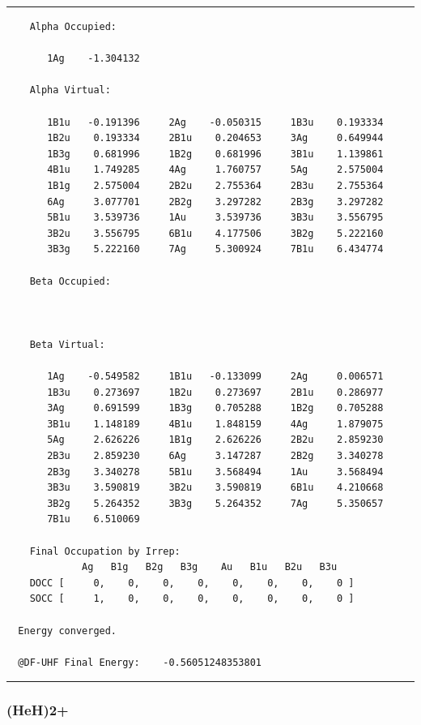\documentclass[portuguese,]{article}
\begin{document}
\begin{center}\rule{0.5\linewidth}{\linethickness}\end{center}

\begin{verbatim}
    Alpha Occupied:

       1Ag    -1.304132

    Alpha Virtual:

       1B1u   -0.191396     2Ag    -0.050315     1B3u    0.193334
       1B2u    0.193334     2B1u    0.204653     3Ag     0.649944
       1B3g    0.681996     1B2g    0.681996     3B1u    1.139861
       4B1u    1.749285     4Ag     1.760757     5Ag     2.575004
       1B1g    2.575004     2B2u    2.755364     2B3u    2.755364
       6Ag     3.077701     2B2g    3.297282     2B3g    3.297282
       5B1u    3.539736     1Au     3.539736     3B3u    3.556795
       3B2u    3.556795     6B1u    4.177506     3B2g    5.222160
       3B3g    5.222160     7Ag     5.300924     7B1u    6.434774

    Beta Occupied:



    Beta Virtual:

       1Ag    -0.549582     1B1u   -0.133099     2Ag     0.006571
       1B3u    0.273697     1B2u    0.273697     2B1u    0.286977
       3Ag     0.691599     1B3g    0.705288     1B2g    0.705288
       3B1u    1.148189     4B1u    1.848159     4Ag     1.879075
       5Ag     2.626226     1B1g    2.626226     2B2u    2.859230
       2B3u    2.859230     6Ag     3.147287     2B2g    3.340278
       2B3g    3.340278     5B1u    3.568494     1Au     3.568494
       3B3u    3.590819     3B2u    3.590819     6B1u    4.210668
       3B2g    5.264352     3B3g    5.264352     7Ag     5.350657
       7B1u    6.510069

    Final Occupation by Irrep:
             Ag   B1g   B2g   B3g    Au   B1u   B2u   B3u
    DOCC [     0,    0,    0,    0,    0,    0,    0,    0 ]
    SOCC [     1,    0,    0,    0,    0,    0,    0,    0 ]

  Energy converged.

  @DF-UHF Final Energy:    -0.56051248353801
\end{verbatim}

\begin{center}\rule{0.5\linewidth}{\linethickness}\end{center}

\hypertarget{heh2-2}{%
\subsubsection{(HeH)2+}\label{heh2-2}}
\end{document}
